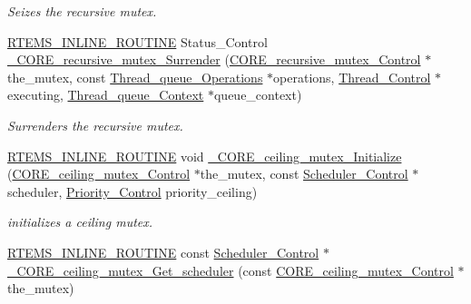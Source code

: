 \begin{DoxyCompactItemize}
\begin{DoxyCompactList}\small\item\em Seizes the recursive mutex. \end{DoxyCompactList}\item 
\mbox{\hyperlink{group__RTEMSScoreBaseDefs_gac216239df231d5dbd15e3520b0b9313f}{R\+T\+E\+M\+S\+\_\+\+I\+N\+L\+I\+N\+E\+\_\+\+R\+O\+U\+T\+I\+NE}} Status\+\_\+\+Control \mbox{\hyperlink{group__RTEMSScoreMutex_ga5096e2975fb3918dafc94ee7d1fc2c06}{\+\_\+\+C\+O\+R\+E\+\_\+recursive\+\_\+mutex\+\_\+\+Surrender}} (\mbox{\hyperlink{structCORE__recursive__mutex__Control}{C\+O\+R\+E\+\_\+recursive\+\_\+mutex\+\_\+\+Control}} $\ast$the\+\_\+mutex, const \mbox{\hyperlink{structThread__queue__Operations}{Thread\+\_\+queue\+\_\+\+Operations}} $\ast$operations, \mbox{\hyperlink{struct__Thread__Control}{Thread\+\_\+\+Control}} $\ast$executing, \mbox{\hyperlink{structThread__queue__Context}{Thread\+\_\+queue\+\_\+\+Context}} $\ast$queue\+\_\+context)
\begin{DoxyCompactList}\small\item\em Surrenders the recursive mutex. \end{DoxyCompactList}\item 
\mbox{\hyperlink{group__RTEMSScoreBaseDefs_gac216239df231d5dbd15e3520b0b9313f}{R\+T\+E\+M\+S\+\_\+\+I\+N\+L\+I\+N\+E\+\_\+\+R\+O\+U\+T\+I\+NE}} void \mbox{\hyperlink{group__RTEMSScoreMutex_gace1e18f3458f6bd2b21d66efdb26b417}{\+\_\+\+C\+O\+R\+E\+\_\+ceiling\+\_\+mutex\+\_\+\+Initialize}} (\mbox{\hyperlink{structCORE__ceiling__mutex__Control}{C\+O\+R\+E\+\_\+ceiling\+\_\+mutex\+\_\+\+Control}} $\ast$the\+\_\+mutex, const \mbox{\hyperlink{struct__Scheduler__Control}{Scheduler\+\_\+\+Control}} $\ast$scheduler, \mbox{\hyperlink{group__RTEMSScorePriority_ga59d02b58072d31a9a1cfe644557aefe2}{Priority\+\_\+\+Control}} priority\+\_\+ceiling)
\begin{DoxyCompactList}\small\item\em initializes a ceiling mutex. \end{DoxyCompactList}\item 
\mbox{\hyperlink{group__RTEMSScoreBaseDefs_gac216239df231d5dbd15e3520b0b9313f}{R\+T\+E\+M\+S\+\_\+\+I\+N\+L\+I\+N\+E\+\_\+\+R\+O\+U\+T\+I\+NE}} const \mbox{\hyperlink{struct__Scheduler__Control}{Scheduler\+\_\+\+Control}} $\ast$ \mbox{\hyperlink{group__RTEMSScoreMutex_gac9a59aa3067426552a8180c362ffcf3c}{\+\_\+\+C\+O\+R\+E\+\_\+ceiling\+\_\+mutex\+\_\+\+Get\+\_\+scheduler}} (const \mbox{\hyperlink{structCORE__ceiling__mutex__Control}{C\+O\+R\+E\+\_\+ceiling\+\_\+mutex\+\_\+\+Control}} $\ast$the\+\_\+mutex)

\end{DoxyCompactItemize}
